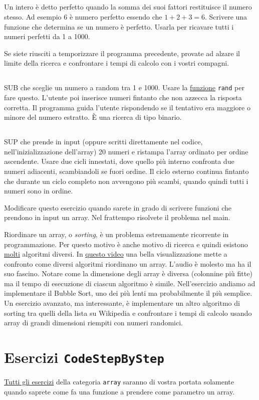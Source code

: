 \documentclass{article}
\begin{document}
\subsection{}
Un intero è detto perfetto quando la somma dei suoi fattori restituisce il numero stesso. Ad esempio 6 è numero perfetto essendo che $1 + 2 + 3 = 6$. Scrivere una funzione che determina se un numero è perfetto. Usarla per ricavare tutti i numeri perfetti da 1 a 1000. 
\begin{info} 
	Se siete riusciti a temporizzare il programma precedente, provate ad alzare il limite della ricerca e confrontare i tempi di calcolo con i vostri compagni.
\end{info}

\subsection{}
SUB che sceglie un numero a random tra 1 e 1000. Usare la \href{http://www.cplusplus.com/reference/cstdlib/rand/}{funzione} \texttt{rand} per fare questo. L'utente poi inserisce numeri fintanto che non azzecca la risposta corretta. Il programma guida l'utente rispondendo se il tentativo era maggiore o minore del numero estratto. È una ricerca di tipo binario.

\subsection{}
SUP che prende in input (oppure scritti direttamente nel codice, nell'inizializzazione dell'array) 20 numeri e ristampa l'array ordinato per ordine ascendente. Usare due cicli  innestati, dove quello più interno confronta due numeri adiacenti, scambiandoli se fuori ordine. Il ciclo esterno continua fintanto che durante un ciclo completo non avvengono più scambi, quando quindi tutti i numeri sono in ordine.

\begin{warn}
	Modificare questo esercizio quando sarete in grado di scrivere funzioni che prendono in input un array. Nel frattempo risolvete il problema nel main.
\end{warn}
\begin{info}
	Riordinare un array, o \textit{sorting}, è un problema estremamente ricorrente in programmazione. Per questo motivo è anche motivo di ricerca e quindi esistono \href{https://en.wikipedia.org/wiki/Sorting_algorithm}{molti} algoritmi diversi. In \href{https://www.youtube.com/watch?v=kPRA0W1kECg}{questo video} una bella visualizzazione mette a confronto come  diversi algoritmi riordinano un array. L'audio è molesto ma ha il suo fascino. Notare come la dimensione degli array è diversa (colonnine più fitte) ma il tempo di esecuzione di ciascun algoritmo è simile. Nell'esercizio andiamo ad implementare il Bubble Sort, uno dei più lenti ma probabilmente il più semplice. Un esercizio avanzato, ma interessante, è implementare un altro algoritmo di sorting tra quelli della lista su Wikipedia e confrontare i tempi di calcolo usando array di grandi dimensioni riempiti con numeri randomici. 
\end{info}

\section*{Esercizi \texttt{CodeStepByStep}}
\href{https://www.codestepbystep.com/problem/list/cpp}{Tutti gli esercizi} della categoria \texttt{array} saranno di vostra portata solamente quando saprete come fa una funzione a prendere come parametro un array.
\end{document}
